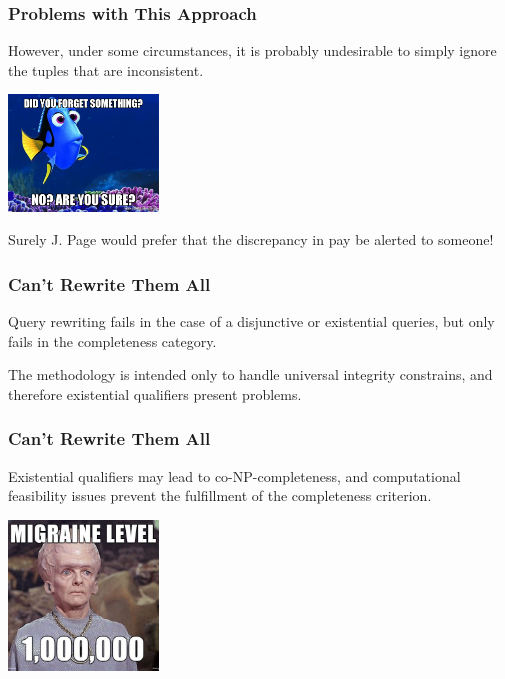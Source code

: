 \begin{frame}
\frametitle{Problems with This Approach}

However, under some circumstances, it is probably undesirable to simply ignore the tuples that are inconsistent. 

\begin{center}
	\includegraphics[width=0.3\textwidth]{images/forgetting.jpg}
\end{center}

Surely J. Page would prefer that the discrepancy in pay be alerted to someone!


\end{frame}

\begin{frame}
\frametitle{Can't Rewrite Them All}

Query rewriting fails in the case of a disjunctive or existential queries, but only fails in the completeness category. 

The methodology is intended only to handle universal integrity constrains, and therefore existential qualifiers present problems. 


\end{frame}

\begin{frame}
\frametitle{Can't Rewrite Them All}

Existential qualifiers may lead to co-NP-completeness, and computational feasibility issues prevent the fulfillment of the completeness criterion. 

\begin{center}
	\includegraphics[width=0.3\textwidth]{images/migraine.jpg}
\end{center}


\end{frame}




